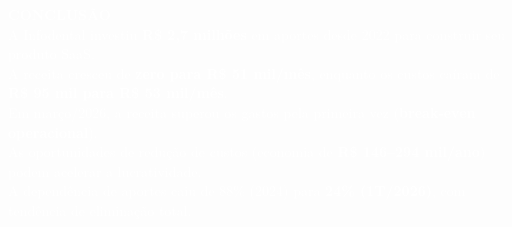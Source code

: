 \documentclass[12pt, a4paper]{article}
\begin{document}
\vspace{0.5cm}
\colorbox{primaryColor}{%
    \parbox{0.95\textwidth}{%
        \centering
        \vspace{0.4cm}
        \textcolor{white}{\large \textbf{CONCLUSÃO}} \\
        \vspace{0.3cm}
        \textcolor{white}{\normalsize A Infodental investiu \textbf{R\$ 2,7 milhões} em aportes desde 2022 para construir seu produto SaaS.} \\
        \textcolor{white}{\normalsize A receita cresceu de \textbf{zero para R\$ 51 mil/mês}, enquanto os custos caíram de \textbf{R\$ 95 mil para R\$ 53 mil/mês}.} \\
        \textcolor{white}{\normalsize Em março/2026, a receita superou os gastos pela primeira vez (\textbf{break-even operacional}).} \\
        \textcolor{white}{\normalsize As oportunidades de redução de custos (economia de \textbf{R\$ 146--294 mil/ano}) podem acelerar a lucratividade.} \\
        \textcolor{white}{\normalsize A dependência de aportes caiu de 88\% (2024) para \textbf{24\% (1T/2026)}, com tendência de eliminação total.} \\
        \vspace{0.4cm}
    }%
}
\end{document}
